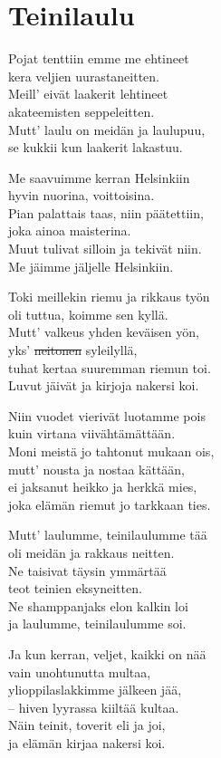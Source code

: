 
\section{Teinilaulu}

Pojat tenttiin emme me ehtineet\\
kera veljien uurastaneitten.\\
Meill' eivät laakerit lehtineet\\
akateemisten seppeleitten.\\
Mutt' laulu on meidän ja laulupuu,\\
se kukkii kun laakerit lakastuu.

Me saavuimme kerran Helsinkiin\\
hyvin nuorina, voittoisina.\\
Pian palattais taas, niin päätettiin,\\
joka ainoa maisterina.\\
Muut tulivat silloin ja tekivät niin.\\
Me jäimme jäljelle Helsinkiin.

Toki meillekin riemu ja rikkaus työn\\
oli tuttua, koimme sen kyllä.\\
Mutt' valkeus yhden keväisen yön,\\
yks' \sout{neitonen} syleilyllä,\\
tuhat kertaa suuremman riemun toi.\\
Luvut jäivät ja kirjoja nakersi koi.

Niin vuodet vierivät luotamme pois\\
kuin virtana viivähtämättään.\\
Moni meistä jo tahtonut mukaan ois,\\
mutt' nousta ja nostaa kättään,\\
ei jaksanut heikko ja herkkä mies,\\
joka elämän riemut jo tarkkaan ties.

Mutt' laulumme, teinilaulumme tää\\
oli meidän ja rakkaus neitten.\\
Ne taisivat täysin ymmärtää\\
teot teinien eksyneitten.\\
Ne shamppanjaks elon kalkin loi\\
ja laulumme, teinilaulumme soi.

Ja kun kerran, veljet, kaikki on nää\\
vain unohtunutta multaa,\\
ylioppilaslakkimme jälkeen jää,\\
– hiven lyyrassa kiiltää kultaa.\\
Näin teinit, toverit eli ja joi,\\
ja elämän kirjaa nakersi koi.